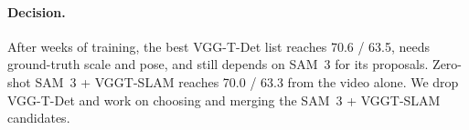 \paragraph{Decision.}
After weeks of training, the best VGG-T-Det list reaches 70.6 / 63.5, needs ground-truth scale and pose, and still
depends on SAM~3 for its proposals. Zero-shot SAM~3 + VGGT-SLAM reaches 70.0 / 63.3 from the video alone. We drop
VGG-T-Det and work on choosing and merging the SAM~3 + VGGT-SLAM candidates.

